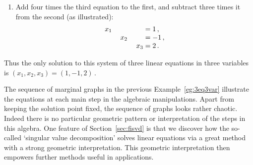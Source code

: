\begin{example}
\begin{solution}
\begin{enumerate}
\item Add four times the third equation to the first, and subtract three times it from the second (as illustrated):
%
\begin{equation*}
\begin{array}{r@{{}={}}l}
x_1\phantom{+x_2-4x_3}&1\,,\\
x_2\phantom{+3x_3}&-1\,,\\
x_3&2\,.
\end{array}
\end{equation*}
\end{enumerate}
Thus the only solution to this system of three linear equations in three variables is \((x_1,x_2,x_3)=(1,-1,2)\)\,.
\end{solution}
\end{example}

The sequence of marginal graphs in the previous Example~\ref{eg:3eq3var} illustrate the equations at each main step in the algebraic manipulations.  
Apart from keeping the solution point fixed, the sequence of graphs looks rather chaotic.
Indeed there is no particular geometric pattern or interpretation of the steps in this algebra.
One feature of Section~\ref{sec:fisvd} is that we discover how the so-called `singular value decomposition' solves linear equations via a great method with a strong geometric interpretation.
This geometric interpretation then empowers further methods useful in applications.



